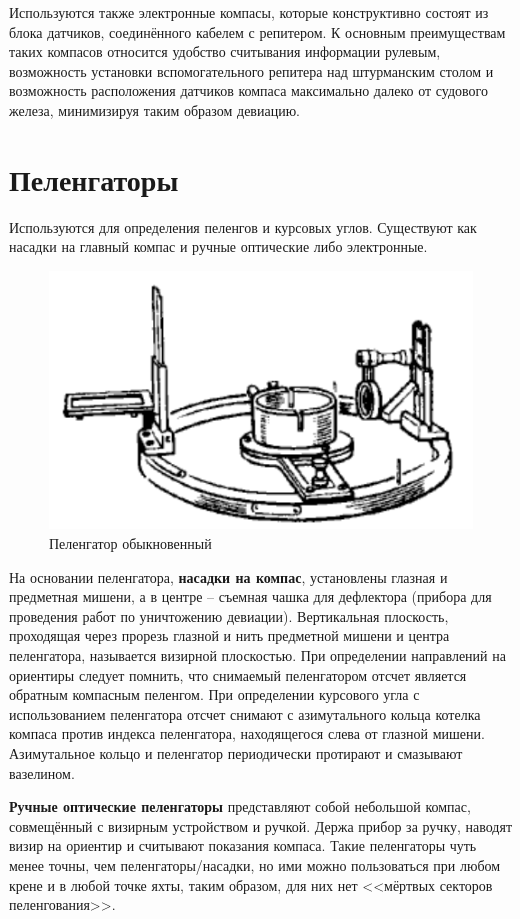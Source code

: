 \documentclass[a4paper, 12pt, twoside, final, book, russian, fittopage, cyremdash]{ncc}
\begin{document}
Используются также электронные компасы, которые конструктивно состоят из блока датчиков, соединённого кабелем с репитером. К основным преимуществам таких компасов относится удобство считывания информации рулевым, возможность установки вспомогательного репитера над штурманским столом и возможность расположения датчиков компаса максимально далеко от судового железа, минимизируя таким образом девиацию. 

\section{Пеленгаторы}

Используются для определения пеленгов и курсовых углов. Существуют как насадки на главный компас и ручные оптические либо электронные. 

\begin{figure}[htb]
  \centering{}
  \includegraphics{N0PELENGATOR}
  \caption{Пеленгатор обыкновенный}
  \label{fig:NPELENGATOR}
\end{figure} 

На основании пеленгатора, \textbf{насадки на компас}, установлены глазная и предметная мишени, а в центре \--- съемная чашка для дефлектора (прибора для проведения работ по уничтожению девиации). Вертикальная плоскость, проходящая через прорезь глазной и нить предметной мишени и центра пеленгатора, называется визирной плоскостью. При определении направлений на ориентиры следует помнить, что снимаемый пеленгатором отсчет является обратным компасным пеленгом. При определении курсового угла с использованием пеленгатора отсчет снимают с азимутального кольца котелка компаса против индекса пеленгатора, находящегося слева от глазной мишени. Азимутальное кольцо и пеленгатор периодически протирают и смазывают вазелином. 

\textbf{Ручные оптические пеленгаторы} представляют собой небольшой компас, совмещённый с визирным устройством и ручкой. Держа прибор за ручку, наводят визир на ориентир и считывают показания компаса. Такие пеленгаторы чуть менее точны, чем пеленгаторы\-/насадки, но ими можно пользоваться при любом крене и в любой точке яхты, таким образом, для них нет <<мёртвых секторов пеленгования>>.
\end{document}
